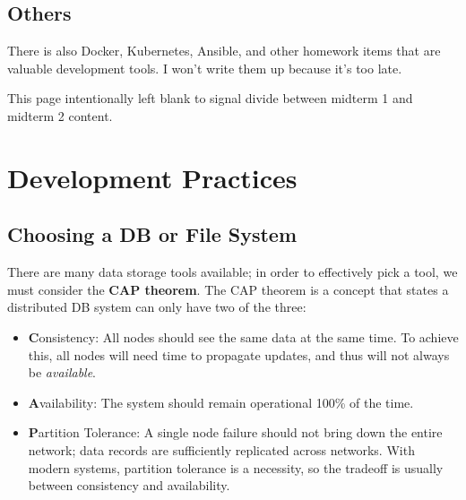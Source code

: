 \documentclass{report}
\begin{document}
\section{Others}

\par There is also Docker, Kubernetes, Ansible, and other homework items that are valuable development tools. I won't write them up because it's too late.




\clearpage
\vspace*{\fill}
\begin{center}
    This page intentionally left blank to signal divide between midterm 1 and midterm 2 content.
\end{center}
\vspace{\fill}
\newpage

\chapter{Development Practices}

\section{Choosing a DB or File System}

\par There are many data storage tools available; in order to effectively pick a tool, we must consider the \textbf{CAP theorem}. The CAP theorem is a concept that states a distributed DB system can only have two of the three:

\begin{itemize}
    \item \textbf{C}onsistency: All nodes should see the same data at the same time. To achieve this, all nodes will need time to propagate updates, and thus will not always be \textit{available}.
    \item \textbf{A}vailability: The system should remain operational 100\% of the time.
    \item \textbf{P}artition Tolerance: A single node failure should not bring down the entire network; data records are sufficiently replicated across networks. With modern systems, partition tolerance is a necessity, so the tradeoff is usually between consistency and availability.
\end{itemize}
\end{document}
